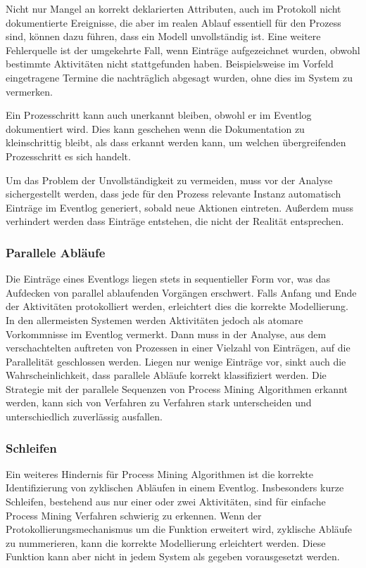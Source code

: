 Nicht nur Mangel an korrekt deklarierten Attributen, auch im Protokoll nicht dokumentierte Ereignisse, die aber im realen Ablauf essentiell für den Prozess sind, können dazu führen, dass ein Modell unvollständig ist. Eine weitere Fehlerquelle ist der umgekehrte Fall, wenn Einträge aufgezeichnet wurden, obwohl bestimmte Aktivitäten nicht stattgefunden haben. Beispielsweise im Vorfeld eingetragene Termine die nachträglich abgesagt wurden, ohne dies im System zu vermerken. 

Ein Prozesschritt kann auch unerkannt bleiben, obwohl er im Eventlog dokumentiert wird. Dies kann geschehen wenn die Dokumentation zu kleinschrittig bleibt, als dass erkannt werden kann, um welchen übergreifenden Prozesschritt es sich handelt. 

Um das Problem der Unvollständigkeit zu vermeiden, muss vor der Analyse sichergestellt werden, dass jede für den Prozess relevante Instanz automatisch Einträge im Eventlog generiert, sobald neue Aktionen eintreten. Außerdem muss  verhindert werden dass Einträge entstehen, die nicht der Realität entsprechen.

\subsubsection{Parallele Abläufe}
Die Einträge eines Eventlogs liegen stets in sequentieller Form vor, was das Aufdecken von parallel ablaufenden Vorgängen erschwert. Falls Anfang und Ende der Aktivitäten protokolliert werden, erleichtert dies die korrekte Modellierung. In den allermeisten Systemen werden Aktivitäten jedoch als atomare Vorkommnisse im Eventlog vermerkt. Dann muss in der Analyse, aus dem verschachtelten auftreten von Prozessen in einer Vielzahl von Einträgen, auf die Parallelität geschlossen werden. Liegen nur wenige Einträge vor, sinkt auch die Wahrscheinlichkeit, dass parallele Abläufe korrekt klassifiziert werden. Die Strategie mit der parallele Sequenzen von Process Mining Algorithmen erkannt werden, kann sich von Verfahren zu Verfahren stark unterscheiden und unterschiedlich zuverlässig ausfallen.

\subsubsection{Schleifen}
Ein weiteres Hindernis für Process Mining Algorithmen ist die korrekte Identifizierung von zyklischen Abläufen in einem Eventlog. Insbesonders kurze Schleifen, bestehend aus nur einer oder zwei Aktivitäten, sind für einfache Process Mining Verfahren schwierig zu erkennen. 
Wenn der Protokollierungsmechanismus um die Funktion erweitert wird, zyklische Abläufe zu nummerieren, kann die korrekte Modellierung erleichtert werden. Diese Funktion kann aber nicht in jedem System als gegeben vorausgesetzt werden.

